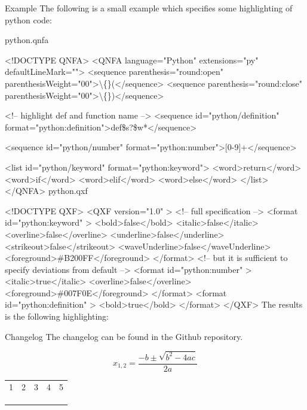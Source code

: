 \documentclass{article}
\begin{document}
	Example
	The following is a small example which specifies some highlighting of python code:
	
	python.qnfa
	
	<!DOCTYPE QNFA>
	<QNFA language="Python" extensions="py" defaultLineMark="">
	<sequence parenthesis="round:open" parenthesisWeight="00">\textbackslash\{\}(</sequence>
	<sequence parenthesis="round:close" parenthesisWeight="00">\textbackslash\{\})</sequence>
	
	<!-- highlight def and function name -->
	<sequence id="python/definition" format="python:definition">def\$s?\$w*</sequence>
	
	<sequence id="python/number" format="python:number">[0-9]+</sequence>
	
	<list id="python/keyword" format="python:keyword">
	<word>return</word>
	<word>if</word>
	<word>elif</word>
	<word>else</word>
	</list>
	</QNFA>
	python.qxf
	
	<!DOCTYPE QXF>
	<QXF version="1.0" >
	<!-- full specification -->
	<format id="python:keyword" >
	<bold>false</bold>
	<italic>false</italic>
	<overline>false</overline>
	<underline>false</underline>
	<strikeout>false</strikeout>
	<waveUnderline>false</waveUnderline>
	<foreground>\#B200FF</foreground>
	</format>
	<!-- but it is sufficient to specify deviations from default -->
	<format id="python:number" >
	<italic>true</italic>
	<overline>false</overline>
	<foreground>\#007F0E</foreground>
	</format>
	<format id="python:definition" >
	<bold>true</bold>
	</format>
	</QXF>
	The results is the following highlighting:
	
	
	Changelog
	The changelog can be found in the Github repository.
	
	
	\begin{equation}
	x_{1,2}=\frac{-b\pm\sqrt{b^2-4 a c}}{2 a}
	\end{equation}
	
	
\begin{table}[h!]
	\centering
	\begin{tabular}{|l|l|l|l|l|}
		\hline
		1 & 2 & 3 & 4 & 5 \\
		&   &   &   &   \\
		&   &   &   &   \\
		&   &   &   &  
	\end{tabular}
\end{table}
	
	
	
	
	
\end{document}
